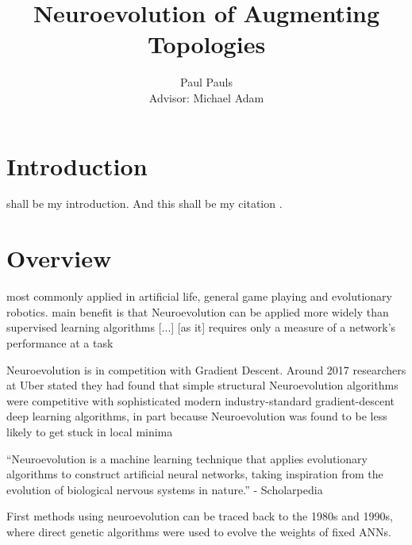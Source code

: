 \documentclass[journal, a4paper]{IEEEtran}
\begin{document}
  \title{Neuroevolution of Augmenting Topologies}
  \author{Paul Pauls\\
          Advisor: Michael Adam}
  \maketitle

\begin{abstract}
\blindtext
\end{abstract}


\section{Introduction}

 shall be my introduction. And this shall be my citation \cite{cite01}.




\section{Overview}

most commonly applied in artificial life, general game playing and evolutionary robotics.
main benefit is that Neuroevolution can be applied more widely than supervised learning algorithms [...] [as it] requires only a measure of a network's performance at a task

Neuroevolution is in competition with Gradient Descent. Around 2017 researchers at Uber stated they had found that simple structural Neuroevolution algorithms were competitive with sophisticated modern industry-standard gradient-descent deep learning algorithms, in part because Neuroevolution was found to be less likely to get stuck in local minima

“Neuroevolution is a machine learning technique that applies evolutionary algorithms to construct artificial neural networks, taking inspiration from the evolution of biological nervous systems in nature.” - Scholarpedia

First methods using neuroevolution can be traced back to the 1980s and 1990s, where direct genetic algorithms were used to evolve the weights of fixed ANNs.\cite{cite05}
\end{document}
